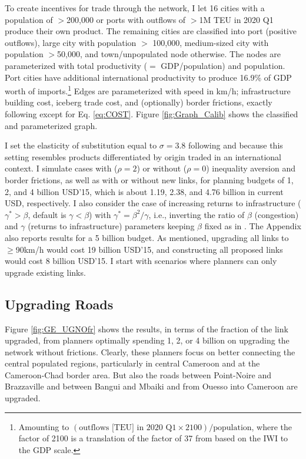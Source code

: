 \documentclass[a4paper]{article}
\begin{document}
To create incentives for trade through the network, I let 16 cities with a population of $>$200,000 or ports with outflows of $>$1M TEU in 2020 Q1 produce their own product. The remaining cities are classified into port (positive outflows), large city with population $>$ 100,000, medium-sized city with population $>$50,000, and town/unpopulated node otherwise. The nodes are parameterized with total productivity ($=$ GDP/population) and population. Port cities have additional international productivity to produce 16.9\% of GDP worth of imports.\footnote{Amounting to $(\text{outflows [TEU] in 2020 Q1}\times 2100)/\text{population}$, where the factor of 2100 is a translation of the factor of 37 from \citet{krantz2024optimal} based on the IWI to the GDP scale.} Edges are parameterized with speed in km/h; infrastructure building cost, iceberg trade cost, and (optionally) border frictions, exactly following \citet{krantz2024optimal} except for Eq. \ref{eq:COST}. Figure \ref{fig:Graph_Calib} shows the classified and parameterized graph. \newline 


I set the elasticity of substitution equal to $\sigma = 3.8$ following \citet{bajzik2020estimating} and \citet{armington1969theory} because this setting resembles products differentiated by origin traded in an international context. I simulate cases with ($\rho = 2$) or without ($\rho = 0$) inequality aversion and border frictions, as well as with or without new links, for planning budgets of 1, 2, and 4 billion USD'15, which is about 1.19, 2.38, and 4.76 billion in current USD, respectively. I also consider the case of increasing returns to infrastructure ($\gamma^* > \beta$, default is $\gamma < \beta$) with $\gamma^* = \beta^2/\gamma$, i.e., inverting the ratio of $\beta$ (congestion) and $\gamma$ (returns to infrastructure) parameters keeping $\beta$ fixed as in \citet{fajgelbaum2020optimal}. The Appendix also reports results for a 5 billion budget. As mentioned, upgrading all links to $\geq$90km/h would cost 19 billion USD'15, and constructing all proposed links would cost 8 billion USD'15. I start with scenarios where planners can only upgrade existing links. 

\subsection{Upgrading Roads} 

Figure \ref{fig:GE_UGNOfr} shows the results, in terms of the fraction of the link upgraded, from planners optimally spending 1, 2, or 4 billion on upgrading the network without frictions. Clearly, these planners focus on better connecting the central populated regions, particularly in central Cameroon and at the Cameroon-Chad border area. But also the roads between Point-Noire and Brazzaville and between Bangui and Mbaiki and from Ouesso into Cameroon are upgraded. \newline %
\end{document}
